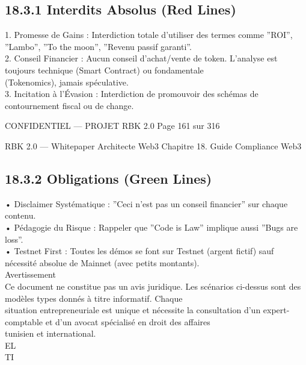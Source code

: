 \documentclass[12pt,landscape,a4paper]{article}
\newenvironment{confidential}
{\begin{tcolorbox}[
    colback=rbkred!5!white,
    colframe=rbkred!75!black,
    title=CONFIDENTIEL,
    fonttitle=\bfseries\color{white},
    coltitle=rbkred!75!black,
    breakable,
    enhanced,
    frame hidden,
    borderline west={2pt}{0pt}{rbkred!75!black}
]}
{\end{tcolorbox}}
\begin{document}
\subsection{18.3.1 Interdits Absolus (Red Lines)}
1. Promesse de Gains : Interdiction totale d’utiliser des termes comme ”ROI”, ”Lambo”, ”To the moon”, ”Revenu passif garanti”.\\
\vspace{0.5em}
2. Conseil Financier : Aucun conseil d’achat/vente de token. L’analyse est toujours technique (Smart Contract) ou fondamentale\\
(Tokenomics), jamais spéculative.\\
\vspace{0.5em}
3. Incitation à l’Évasion : Interdiction de promouvoir des schémas de contournement fiscal ou de change.\\
\vspace{0.5em}
\vspace{0.5em}
\begin{confidential}CONFIDENTIEL — PROJET RBK 2.0                                  Page 161 sur 316\end{confidential}
RBK 2.0 — Whitepaper Architecte Web3                                                                                    Chapitre 18. Guide Compliance Web3\\
\vspace{0.5em}
\vspace{0.5em}
\subsection{18.3.2 Obligations (Green Lines)}
• Disclaimer Systématique : ”Ceci n’est pas un conseil financier” sur chaque contenu.\\
\vspace{0.5em}
• Pédagogie du Risque : Rappeler que ”Code is Law” implique aussi ”Bugs are loss”.\\
\vspace{0.5em}
• Testnet First : Toutes les démos se font sur Testnet (argent fictif) sauf nécessité absolue de Mainnet (avec petits montants).\\
\vspace{0.5em}
Avertissement\\
Ce document ne constitue pas un avis juridique. Les scénarios ci-dessus sont des modèles types donnés à titre informatif. Chaque\\
situation entrepreneuriale est unique et nécessite la consultation d’un expert-comptable et d’un avocat spécialisé en droit des affaires\\
tunisien et international.\\
\vspace{0.5em}
\vspace{0.5em}
\vspace{0.5em}
\vspace{0.5em}
EL\\
TI\\
\end{document}
